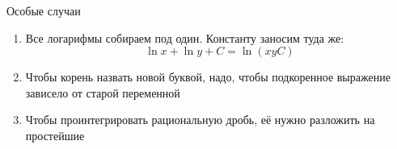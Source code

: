 \begin{undefthm}{Особые случаи}
\begin{enumerate}
\begin{enumerate}
\begin{itemize}
\begin{itemize}
\begin{enumerate}
                    \end{enumerate}
                \end{itemize}
            \end{itemize}
        \end{enumerate}
        \item Все логарифмы собираем под один. Константу заносим туда же:
        $$ \ln x + \ln y + C = \ln(xyC) $$
        \item Чтобы корень назвать новой буквой, надо, чтобы подкоренное выражение  зависело от старой переменной
        \item Чтобы проинтегрировать рациональную дробь, её нужно разложить на простейшие
    \end{enumerate}
\end{undefthm}

